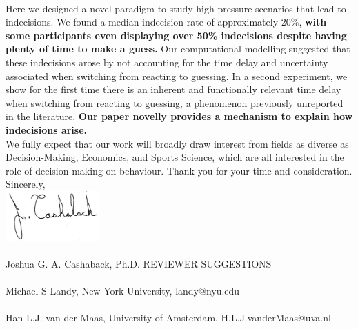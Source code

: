 \documentclass[12pt]{article}
\begin{document}
\vspace{3mm}
\\
Here we designed a novel paradigm to study high pressure scenarios that lead to indecisions. We found a median indecision rate of approximately 20\%, \textbf{with some participants even displaying over 50\% indecisions despite having plenty of time to make a guess.} Our computational modelling suggested that these indecisions arose by not accounting for the time delay and uncertainty associated when switching from reacting to guessing. In a second experiment, we show for the first time there is an inherent and functionally relevant time delay when switching from reacting to guessing, a phenomenon previously unreported in the literature. \textbf{Our paper novelly provides a mechanism to explain how indecisions arise.}
\vspace{3mm}
\\
We fully expect that our work will broadly draw interest from fields as diverse as Decision-Making, Economics, and Sports Science, which are all interested in the role of decision-making on behaviour.
Thank you for your time and consideration.
\vspace{3mm}
\\
Sincerely, 
\vspace{3mm}
\\
\includegraphics[height=0.75in]{signature}
\\
\vspace{-3.5mm}
\\
Joshua G. A. Cashaback, Ph.D.
\thispagestyle{fancy}
\rfoot{\textcolor{myudblue}{\thepage}}
\newpage
\noindent \textcolor{myudblue}{REVIEWER SUGGESTIONS}
\\
\\
Michael S Landy, New York University, landy@nyu.edu
\\
\\
Han L.J. van der Maas, University of Amsterdam, H.L.J.vanderMaas@uva.nl 
\\
\end{document}
